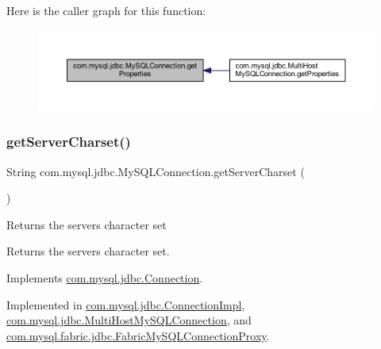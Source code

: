 Here is the caller graph for this function\+:
\nopagebreak
\begin{figure}[H]
\begin{center}
\leavevmode
\includegraphics[width=350pt]{interfacecom_1_1mysql_1_1jdbc_1_1_my_s_q_l_connection_a494cb1c438fb5e65b5fb9916c8331191_icgraph}
\end{center}
\end{figure}
\mbox{\label{interfacecom_1_1mysql_1_1jdbc_1_1_my_s_q_l_connection_a4f921d9cf354764fd1241cd56c0abecb}} 
\subsubsection{\texorpdfstring{get\+Server\+Charset()}{getServerCharset()}}
{\footnotesize\ttfamily String com.\+mysql.\+jdbc.\+My\+S\+Q\+L\+Connection.\+get\+Server\+Charset (\begin{DoxyParamCaption}{ }\end{DoxyParamCaption})}

Returns the server\textquotesingle{}s character set

\begin{DoxyReturn}{Returns}
the server\textquotesingle{}s character set. 
\end{DoxyReturn}


Implements \mbox{\hyperlink{interfacecom_1_1mysql_1_1jdbc_1_1_connection_a1831e47e0daa7d5a4b362219105a85ec}{com.\+mysql.\+jdbc.\+Connection}}.



Implemented in \mbox{\hyperlink{classcom_1_1mysql_1_1jdbc_1_1_connection_impl_aec1bc6ca740ae9b75d6cad0f3126a276}{com.\+mysql.\+jdbc.\+Connection\+Impl}}, \mbox{\hyperlink{classcom_1_1mysql_1_1jdbc_1_1_multi_host_my_s_q_l_connection_ade6eec72969b91ca518b7750d0af4539}{com.\+mysql.\+jdbc.\+Multi\+Host\+My\+S\+Q\+L\+Connection}}, and \mbox{\hyperlink{classcom_1_1mysql_1_1fabric_1_1jdbc_1_1_fabric_my_s_q_l_connection_proxy_a05da3e56f23e090e7a4048dcd59d1454}{com.\+mysql.\+fabric.\+jdbc.\+Fabric\+My\+S\+Q\+L\+Connection\+Proxy}}.

